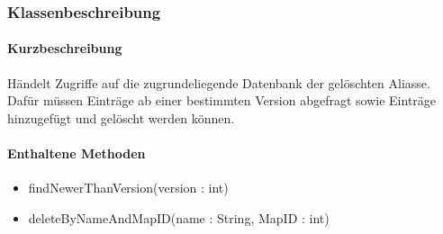 \subsubsection*{Klassenbeschreibung}%
\paragraph*{Kurzbeschreibung}
Händelt Zugriffe auf die zugrundeliegende Datenbank der gelöschten Aliasse.
Dafür müssen Einträge ab einer bestimmten Version abgefragt sowie Einträge hinzugefügt und gelöscht werden können.
\paragraph*{Enthaltene Methoden}
\begin{itemize}
    \item findNewerThanVersion(version : int)
    \item deleteByNameAndMapID(name : String, MapID : int)
\end{itemize}
